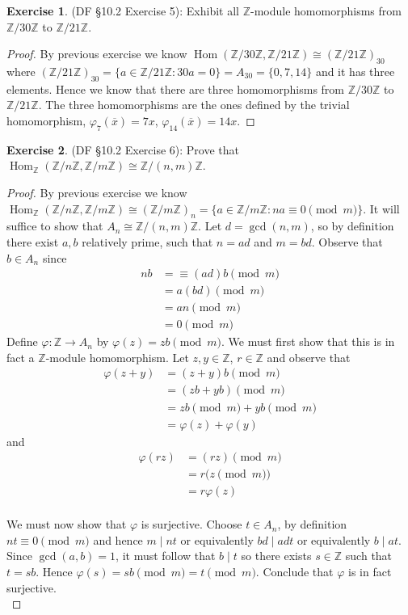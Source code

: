 \documentclass[8pt]{amsart}
\theoremstyle{plain}%
\theoremstyle{definition}
\newtheorem*{exercise}{Exercise}%
\theoremstyle{remark}
\numberwithin{equation}{section}
\newcommand{\Z}{\mathbb{Z}}
\begin{document}
\begin{exercise}
(DF \S 10.2 Exercise 5): Exhibit all $\Z$-module homomorphisms from $\Z/30\Z$ to $\Z/21\Z$.
	\begin{proof}
	By previous exercise we know $\operatorname{Hom}(\Z/30\Z, \Z/21\Z) \cong (\Z/21\Z)_{30}$ where $(\Z/21\Z)_{30} = \{a \in \Z/21\Z : 30a = 0\} = A_{30}  = \{0, 7, 14\}$ and it has three elements. Hence we know that there are three homomorphisms from $\Z/30\Z$ to $\Z/21\Z$. The three homomorphisms are the ones defined by the trivial homomorphism, $\varphi_7(\overline x) = 7x$, $\varphi_{14}(\overline x) = 14x$.
	\end{proof}
\end{exercise}

\begin{exercise}
(DF \S 10.2 Exercise 6): Prove that $\operatorname{Hom}_\Z(\Z/n\Z, \Z/m\Z) \cong \Z/(n, m)\Z$.
	\begin{proof}
		By previous exercise we know $\operatorname{Hom}_\Z(\Z/n\Z, \Z/m\Z) \cong (\Z/m\Z)_n = \{a \in \Z/m\Z : na \equiv 0 \pmod m \}$. It will suffice to show that $A_n \cong \Z/(n, m)\Z$. Let $d = \gcd(n, m)$, so by definition there exist $a, b$ relatively prime, such that $n = ad$ and $m = bd$. Observe that $b \in A_n$ since
		\begin{align*}
			nb &= \equiv (ad)b \pmod m\\
			&= a(bd) \pmod m\\
			&= an \pmod m\\
			&= 0 \pmod m
		\end{align*}
		Define $\varphi : \Z \to A_n$ by $\varphi(z) = zb \pmod m$. We must first show that this is in fact a $\Z$-module homomorphism. Let $z, y \in \Z$, $r \in \Z$ and observe that
		\begin{align*}
			\varphi(z + y) &= (z + y)b \pmod m\\
			&= (zb + yb) \pmod m\\
			&= zb \pmod m + yb \pmod m\\
			&= \varphi(z) + \varphi(y)
		\end{align*}
		and
		\begin{align*}
			\varphi(rz) &= (rz)\pmod m\\
			&= r \big(z\pmod m\big)\\
			&= r \varphi(z)\\
		\end{align*}

		We must now show that $\varphi$ is surjective. Choose $t \in A_n$, by definition $nt \equiv 0 \pmod m$ and hence $m \mid nt$ or equivalently $bd \mid adt$ or equivalently $b \mid at$. Since $\gcd(a, b) = 1$, it must follow that $b \mid t$ so there exists $s \in \Z$ such that $t = sb$. Hence $\varphi(s) = sb \pmod m = t \pmod m$. Conclude that $\varphi$ is in fact surjective. \\


\end{proof}
\end{exercise}
\end{document}
